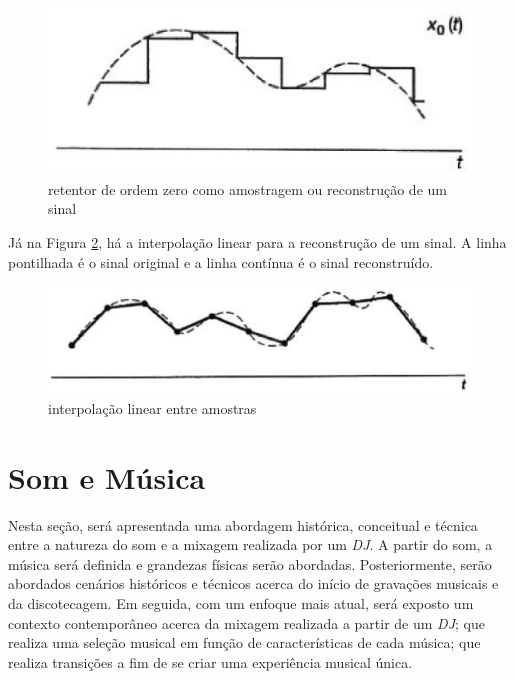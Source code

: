 \begin{figure}[h]
	\centering
    \includegraphics[scale=0.4]{figuras/fig05.eps}
	\caption{retentor de ordem zero como amostragem ou reconstrução de um sinal}
	\label{fig05}
\end{figure}

Já na Figura \ref{fig06}, há a interpolação linear para a reconstrução de um sinal. A linha pontilhada é o sinal original e a linha contínua é o sinal reconstruído. 

\begin{figure}[h]
	\centering
    \includegraphics[scale=0.4]{figuras/fig06.eps}
	\caption{interpolação linear entre amostras}
	\label{fig06}
\end{figure}


\section{Som e Música}
Nesta seção, será apresentada uma abordagem histórica, conceitual e técnica entre a natureza do som e a mixagem realizada por um \textit{DJ}. A partir do som, a música será definida e grandezas físicas serão abordadas. Posteriormente, serão abordados cenários históricos e técnicos acerca do início de gravações musicais e da discotecagem. Em seguida, com um enfoque mais atual, será exposto um contexto contemporâneo acerca da mixagem realizada a partir de um \textit{DJ}; que realiza uma seleção musical em função de características de cada música; que realiza transições a fim de se criar uma experiência musical única.

